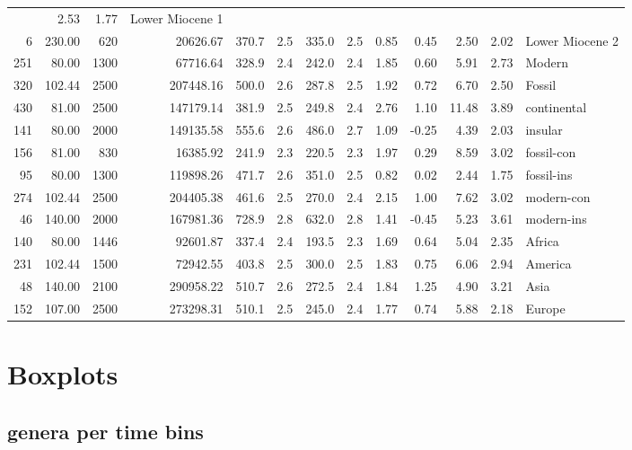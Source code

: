 \documentclass[]{article}
\begin{document}
\begin{longtable}[]{@{}rrrrrrrrrrrrl@{}}
& 2.53 & 1.77 & Lower Miocene 1\tabularnewline
6 & 230.00 & 620 & 20626.67 & 370.7 & 2.5 & 335.0 & 2.5 & 0.85 & 0.45 &
2.50 & 2.02 & Lower Miocene 2\tabularnewline
251 & 80.00 & 1300 & 67716.64 & 328.9 & 2.4 & 242.0 & 2.4 & 1.85 & 0.60
& 5.91 & 2.73 & Modern\tabularnewline
320 & 102.44 & 2500 & 207448.16 & 500.0 & 2.6 & 287.8 & 2.5 & 1.92 &
0.72 & 6.70 & 2.50 & Fossil\tabularnewline
430 & 81.00 & 2500 & 147179.14 & 381.9 & 2.5 & 249.8 & 2.4 & 2.76 & 1.10
& 11.48 & 3.89 & continental\tabularnewline
141 & 80.00 & 2000 & 149135.58 & 555.6 & 2.6 & 486.0 & 2.7 & 1.09 &
-0.25 & 4.39 & 2.03 & insular\tabularnewline
156 & 81.00 & 830 & 16385.92 & 241.9 & 2.3 & 220.5 & 2.3 & 1.97 & 0.29 &
8.59 & 3.02 & fossil-con\tabularnewline
95 & 80.00 & 1300 & 119898.26 & 471.7 & 2.6 & 351.0 & 2.5 & 0.82 & 0.02
& 2.44 & 1.75 & fossil-ins\tabularnewline
274 & 102.44 & 2500 & 204405.38 & 461.6 & 2.5 & 270.0 & 2.4 & 2.15 &
1.00 & 7.62 & 3.02 & modern-con\tabularnewline
46 & 140.00 & 2000 & 167981.36 & 728.9 & 2.8 & 632.0 & 2.8 & 1.41 &
-0.45 & 5.23 & 3.61 & modern-ins\tabularnewline
140 & 80.00 & 1446 & 92601.87 & 337.4 & 2.4 & 193.5 & 2.3 & 1.69 & 0.64
& 5.04 & 2.35 & Africa\tabularnewline
231 & 102.44 & 1500 & 72942.55 & 403.8 & 2.5 & 300.0 & 2.5 & 1.83 & 0.75
& 6.06 & 2.94 & America\tabularnewline
48 & 140.00 & 2100 & 290958.22 & 510.7 & 2.6 & 272.5 & 2.4 & 1.84 & 1.25
& 4.90 & 3.21 & Asia\tabularnewline
152 & 107.00 & 2500 & 273298.31 & 510.1 & 2.5 & 245.0 & 2.4 & 1.77 &
0.74 & 5.88 & 2.18 & Europe\tabularnewline
\bottomrule
\end{longtable}

\newpage

\section{Boxplots}\label{boxplots}

\subsection{genera per time bins}\label{genera-per-time-bins}
\end{document}
